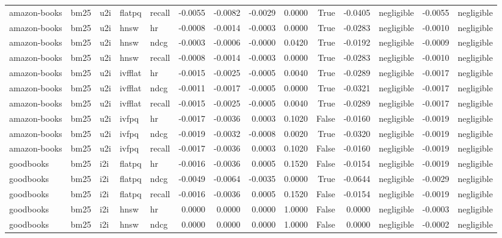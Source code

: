 \begin{tabular}{lllllrrrrrrlrl}
amazon-books & bm25 & u2i & flatpq & recall & -0.0055 & -0.0082 & -0.0029 & 0.0000 & True & -0.0405 & negligible & -0.0055 & negligible \\
amazon-books & bm25 & u2i & hnsw & hr & -0.0008 & -0.0014 & -0.0003 & 0.0000 & True & -0.0283 & negligible & -0.0010 & negligible \\
amazon-books & bm25 & u2i & hnsw & ndcg & -0.0003 & -0.0006 & -0.0000 & 0.0420 & True & -0.0192 & negligible & -0.0009 & negligible \\
amazon-books & bm25 & u2i & hnsw & recall & -0.0008 & -0.0014 & -0.0003 & 0.0000 & True & -0.0283 & negligible & -0.0010 & negligible \\
amazon-books & bm25 & u2i & ivfflat & hr & -0.0015 & -0.0025 & -0.0005 & 0.0040 & True & -0.0289 & negligible & -0.0017 & negligible \\
amazon-books & bm25 & u2i & ivfflat & ndcg & -0.0011 & -0.0017 & -0.0005 & 0.0000 & True & -0.0321 & negligible & -0.0017 & negligible \\
amazon-books & bm25 & u2i & ivfflat & recall & -0.0015 & -0.0025 & -0.0005 & 0.0040 & True & -0.0289 & negligible & -0.0017 & negligible \\
amazon-books & bm25 & u2i & ivfpq & hr & -0.0017 & -0.0036 & 0.0003 & 0.1020 & False & -0.0160 & negligible & -0.0019 & negligible \\
amazon-books & bm25 & u2i & ivfpq & ndcg & -0.0019 & -0.0032 & -0.0008 & 0.0020 & True & -0.0320 & negligible & -0.0019 & negligible \\
amazon-books & bm25 & u2i & ivfpq & recall & -0.0017 & -0.0036 & 0.0003 & 0.1020 & False & -0.0160 & negligible & -0.0019 & negligible \\
goodbooks & bm25 & i2i & flatpq & hr & -0.0016 & -0.0036 & 0.0005 & 0.1520 & False & -0.0154 & negligible & -0.0019 & negligible \\
goodbooks & bm25 & i2i & flatpq & ndcg & -0.0049 & -0.0064 & -0.0035 & 0.0000 & True & -0.0644 & negligible & -0.0029 & negligible \\
goodbooks & bm25 & i2i & flatpq & recall & -0.0016 & -0.0036 & 0.0005 & 0.1520 & False & -0.0154 & negligible & -0.0019 & negligible \\
goodbooks & bm25 & i2i & hnsw & hr & 0.0000 & 0.0000 & 0.0000 & 1.0000 & False & 0.0000 & negligible & -0.0003 & negligible \\
goodbooks & bm25 & i2i & hnsw & ndcg & 0.0000 & 0.0000 & 0.0000 & 1.0000 & False & 0.0000 & negligible & -0.0002 & negligible \\

\end{tabular}
